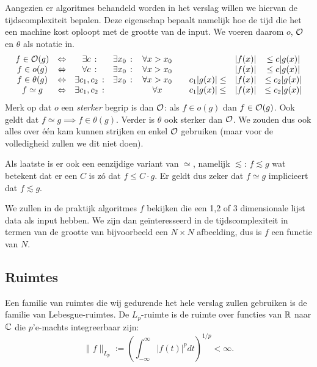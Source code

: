 Aangezien er algoritmes behandeld worden in het verslag willen we hiervan de tijdscomplexiteit bepalen.
Deze eigenschap bepaalt namelijk hoe de tijd die het een machine kost oploopt met de grootte van de input.
We voeren daarom $o$, $\mathcal{O}$ en $\theta$ als notatie in.
\begin{equation*}
\begin{array}{cccccccc}
  f \in \mathcal{O}(g)     &\Leftrightarrow& \exists c     \,:&\exists x_0  \,:&\, 
  \forall x>x_0 \quad&& |f(x)| &\leq c|g(x)|  \\
  f \in o(g)      &\Leftrightarrow& \forall c     \,:&\exists x_0  \,:&\, 
  \forall x>x_0 \quad&& |f(x)| &\leq c |g(x)| \\ 
  f \in \theta(g) &\Leftrightarrow& \exists c_1,c_2\,:&\exists x_0  \,:&\, 
  \forall x>x_0 \quad& c_1|g(x)| \leq & |f(x)| &\leq c_2|g(x)|  \\
  f \simeq g & \Leftrightarrow& \exists c_1,c_2\,:& \,&\, 
  \forall x \quad& c_1|g(x)| \leq & |f(x)| &\leq c_2|g(x)| 

\end{array}
\end{equation*}
Merk op dat $o$ een \emph{sterker} begrip is dan $\mathcal{O}$: als $f \in o(g)$ dan $f \in \mathcal{O}(g)$. Ook geldt dat $f\simeq g \implies f\in\theta(g)$. Verder is $\theta$ ook sterker dan $\mathcal{O}$. We zouden dus ook alles over \'e\'en kam kunnen strijken en enkel $\mathcal{O}$ gebruiken (maar voor de volledigheid zullen we dit niet doen).

Als laatste is er ook een eenzijdige variant van $\simeq$, namelijk $\lesssim$: $f \lesssim g$ wat betekent dat er een $C$ is z\'o dat $f \leq C \cdot g$. Er geldt dus zeker dat $f\simeq g$ implicieert dat $f\lesssim g$.

We zullen in de praktijk algoritmes $f$ bekijken die een 1,2 of 3 dimensionale lijst data als input hebben.
We zijn dan ge\"interesseerd in de tijdscomplexiteit in termen van de grootte van bijvoorbeeld een $N\times N$ 
afbeelding, dus is $f$ een functie van $N$.

\subsection{Ruimtes}
\label{ruimtes}
Een familie van ruimtes die wij gedurende het hele verslag zullen gebruiken is de familie van Lebesgue-ruimtes. De $L_p$-ruimte is de ruimte over functies van $\mathbb{R}$ naar $\mathbb{C}$ die $p$'e-machts integreerbaar zijn:
\begin{equation}
	\label{lebesgue}
	\| f \|_{L_p} := \left(\int_{-\infty}^\infty |f(t)|^p dt\right)^{1/p} < \infty.
\end{equation}

